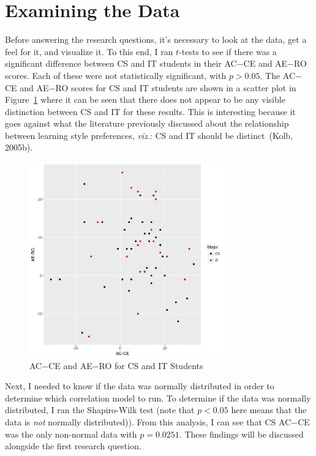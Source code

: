 \section{Examining the Data}
Before answering the research questions, it's necessary to look at the data, get a feel for it, and visualize it. To this end, I ran $t$-tests to see if there was a significant difference between CS and IT students in their AC$-$CE and AE$-$RO scores. Each of these were not statistically significant, with $p>0.05$. The AC$-$CE and AE$-$RO scores for CS and IT students are shown in a scatter plot in Figure~\ref{fig:c-cs-v-it-plot} where it can be seen that there does not appear to be any visible distinction between CS and IT for these results. This is interesting because it goes against what the literature previously discussed about the relationship between learning style preferences, \textit{viz}.: CS and IT should be distinct~(Kolb, 2005b).

\begin{figure}[!bhtb]
  \centering
  \includegraphics[width=0.75\textwidth]{figures/chapter4/cs-v-it-plot.jpg}
  \caption[AC$-$CE and AE$-$RO for CS and IT Students]{AC$-$CE and AE$-$RO for CS and IT Students}
  \label{fig:c-cs-v-it-plot}
\end{figure}

Next, I needed to know if the data was normally distributed in order to determine which correlation model to run. To determine if the data was normally distributed, I ran the Shapiro-Wilk test (note that $p<0.05$ here means that the data is \emph{not} normally distributed)). From this analysis, I can see that CS AC$-$CE was the only non-normal data with $p=0.0251$. These findings will be discussed alongside the first research question.

